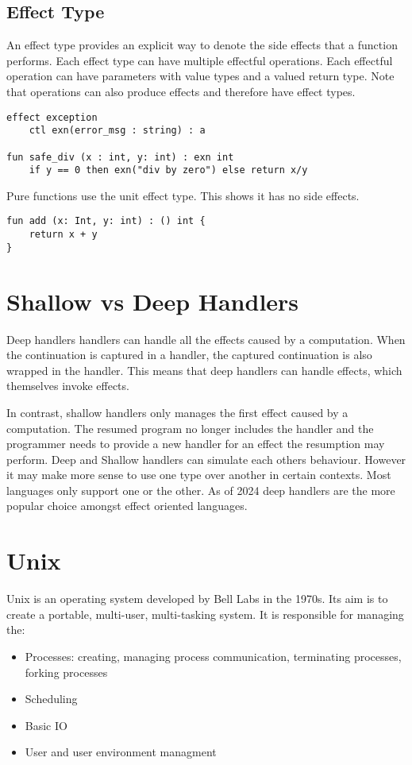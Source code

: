 \documentclass[logo,bsc,singlespacing,parskip]{infthesis}
\begin{document}
\subsection{Effect Type}
An effect type provides an explicit way to denote the side effects that a function performs. Each effect type can have multiple effectful operations. Each effectful operation can have parameters with value types and a valued return type. Note that operations can also produce effects and therefore have effect types.

\begin{lstlisting}
effect exception
    ctl exn(error_msg : string) : a 

fun safe_div (x : int, y: int) : exn int
    if y == 0 then exn("div by zero") else return x/y
\end{lstlisting}

Pure functions use the unit effect type. This shows it has no side effects. 

\begin{lstlisting}
fun add (x: Int, y: int) : () int {
	return x + y
}
\end{lstlisting}

\section{Shallow vs Deep Handlers}

Deep handlers \cite{hillerstrom_foundations_nodate} handlers can handle all the effects caused by a computation. When the continuation is captured in a handler, the captured continuation is also wrapped in the handler. This means that deep handlers can handle effects, which themselves invoke effects. 

In contrast, shallow handlers \cite{ryu_shallow_2018} only manages the first effect caused by a computation. The resumed program no longer includes the handler and the programmer needs to provide a new handler for an effect the resumption may perform.
Deep and Shallow handlers can simulate each others behaviour. However it may make more sense to use one type over another in certain contexts. Most languages only support one or the other. As of 2024 deep handlers are the more popular choice amongst effect oriented languages.




\section{Unix}
Unix is an operating system developed by Bell Labs in the 1970s. Its aim is to create a portable, multi-user, multi-tasking system. It is responsible for managing the:
\begin{itemize}
    \item Processes: creating, managing process communication, terminating processes, forking processes
    \item Scheduling
    \item Basic IO
    \item User and user environment managment
\end{itemize}
\end{document}
